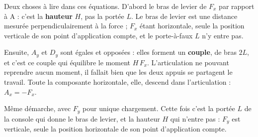 Deux choses à lire dans ces équations. D'abord le bras de levier de $F_x$ par rapport à A : c'est la \textbf{hauteur} $H$, pas la portée $L$. Le bras de levier est une distance mesurée perpendiculairement à la force ; $F_x$ étant horizontale, seule la position verticale de son point d'application compte, et le porte-à-faux $L$ n'y entre pas.

Ensuite, $A_y$ et $D_y$ sont égales et opposées : elles forment un \textbf{couple}, de bras $2L$, et c'est ce couple qui équilibre le moment $H\,F_x$. L'articulation ne pouvant reprendre aucun moment, il fallait bien que les deux appuis se partagent le travail. Toute la composante horizontale, elle, descend dans l'articulation : $A_x = -F_x$.


Même démarche, avec $F_y$ pour unique chargement. Cette fois c'est la portée $L$ de la console qui donne le bras de levier, et la hauteur $H$ qui n'entre pas : $F_y$ est verticale, seule la position horizontale de son point d'application compte.

\begin{center}
\end{center}


